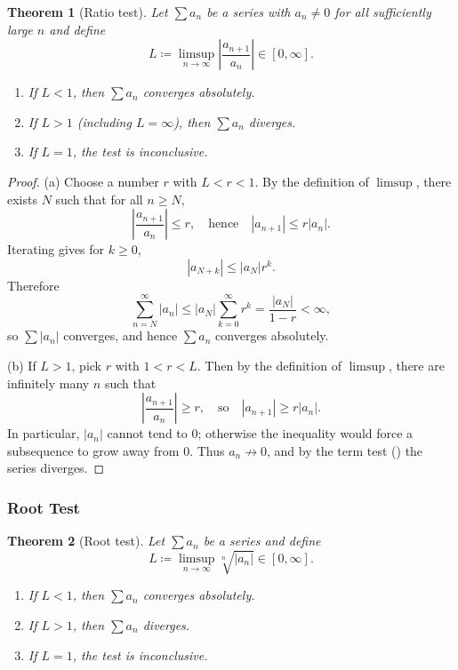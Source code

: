 \documentclass[12pt]{article}
\numberwithin{equation}{section}
\def\abs#1{|#1|}
\DeclarePairedDelimiter{\abs}{\lvert}{\rvert}
\theoremstyle{plain}
\newtheorem{theorem}{Theorem}[section]
\theoremstyle{definition}
\theoremstyle{remark}
\begin{document}
\begin{theorem}[Ratio test]\label{thm:ratio}
Let $\sum a_n$ be a series with $a_n\neq 0$ for all sufficiently large $n$ and define
\[
L \coloneqq \limsup_{n\to\infty}\abs{\frac{a_{n+1}}{a_n}} \in [0,\infty].
\]
\begin{enumerate}[label=(\alph*)]
\item If $L<1$, then $\sum a_n$ converges absolutely.
\item If $L>1$ (including $L=\infty$), then $\sum a_n$ diverges.
\item If $L=1$, the test is inconclusive.
\end{enumerate}
\end{theorem}

\begin{proof}
(a) Choose a number $r$ with $L<r<1$.
By the definition of $\limsup$, there exists $N$ such that for all $n\ge N$,
\[
\abs{\frac{a_{n+1}}{a_n}} \le r,
\quad\text{hence}\quad
\abs{a_{n+1}} \le r\abs{a_n}.
\]
Iterating gives for $k\ge 0$,
\[
\abs{a_{N+k}} \le \abs{a_N} r^{k}.
\]
Therefore
\[
\sum_{n=N}^{\infty}\abs{a_n}
\le
\abs{a_N}\sum_{k=0}^{\infty} r^{k}
=
\frac{\abs{a_N}}{1-r}<\infty,
\]
so $\sum \abs{a_n}$ converges, and hence $\sum a_n$ converges absolutely.

(b) If $L>1$, pick $r$ with $1<r<L$.
Then by the definition of $\limsup$, there are infinitely many $n$ such that
\[
\abs{\frac{a_{n+1}}{a_n}} \ge r,
\quad\text{so}\quad
\abs{a_{n+1}} \ge r\abs{a_n}.
\]
In particular, $\abs{a_n}$ cannot tend to $0$; otherwise the inequality would force a subsequence to grow away from $0$.
Thus $a_n\not\to 0$, and by the term test () the series diverges.
\end{proof}

\subsubsection{Root Test}

\begin{theorem}[Root test]\label{thm:root}
Let $\sum a_n$ be a series and define
\[
L \coloneqq \limsup_{n\to\infty}\sqrt[n]{\abs{a_n}} \in [0,\infty].
\]
\begin{enumerate}[label=(\alph*)]
\item If $L<1$, then $\sum a_n$ converges absolutely.
\item If $L>1$, then $\sum a_n$ diverges.
\item If $L=1$, the test is inconclusive.
\end{enumerate}
\end{theorem}
\end{document}
